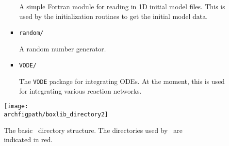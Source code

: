 \begin{itemize}
\begin{itemize}
\begin{itemize}
      A simple Fortran module for reading in 1D initial model files.
      This is used by the initialization routines to get the initial
      model data.

    \item {\tt random/}

      A random number generator.

    \item {\tt VODE/}

      The {\tt VODE} \cite{vode} package for integrating ODEs.  At the
      moment, this is used for integrating various reaction networks.
 
   \end{itemize}

  \end{itemize}

\end{itemize}


\begin{figure}[t]
\centering
\texttt{[image: \\archfigpath/boxlib\_directory2]}
\caption[\boxlib\ directory structure] {\label{fig:arch:boxlib} The
  basic \boxlib\ directory structure.  The directories used by
  \maestro\ are indicated in red.}
\end{figure}

